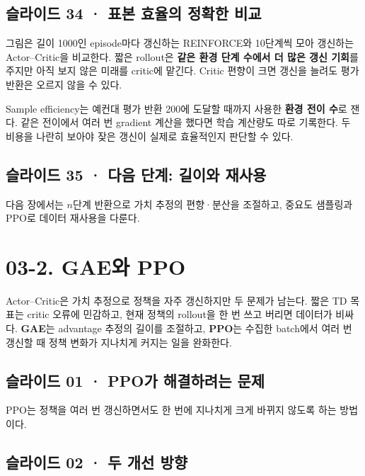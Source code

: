 \documentclass[11pt,a4paper]{article}
\begin{document}
\subsection{슬라이드 34 · 표본 효율의 정확한 비교}

그림은 길이 1000인 episode마다 갱신하는 REINFORCE와 10단계씩 모아 갱신하는 Actor–Critic을 비교한다. 짧은 rollout은 \textbf{같은 환경 단계 수에서 더 많은 갱신 기회}를 주지만 아직 보지 않은 미래를 critic에 맡긴다. Critic 편향이 크면 갱신을 늘려도 평가 반환은 오르지 않을 수 있다.\par

Sample efficiency는 예컨대 평가 반환 200에 도달할 때까지 사용한 \textbf{환경 전이 수}로 잰다. 같은 전이에서 여러 번 gradient 계산을 했다면 학습 계산량도 따로 기록한다. 두 비용을 나란히 보아야 잦은 갱신이 실제로 효율적인지 판단할 수 있다.\par

\subsection{슬라이드 35 · 다음 단계: 길이와 재사용}

다음 장에서는 $n$단계 반환으로 가치 추정의 편향·분산을 조절하고, 중요도 샘플링과 PPO로 데이터 재사용을 다룬다.\par

\clearpage
\section{03-2. GAE와 PPO}


Actor–Critic은 가치 추정으로 정책을 자주 갱신하지만 두 문제가 남는다. 짧은 TD 목표는 critic 오류에 민감하고, 현재 정책의 rollout을 한 번 쓰고 버리면 데이터가 비싸다. \textbf{GAE}는 advantage 추정의 길이를 조절하고, \textbf{PPO}는 수집한 batch에서 여러 번 갱신할 때 정책 변화가 지나치게 커지는 일을 완화한다.\par

\subsection{슬라이드 01 · PPO가 해결하려는 문제}

PPO는 정책을 여러 번 갱신하면서도 한 번에 지나치게 크게 바뀌지 않도록 하는 방법이다.\par

\subsection{슬라이드 02 · 두 개선 방향}
\end{document}

